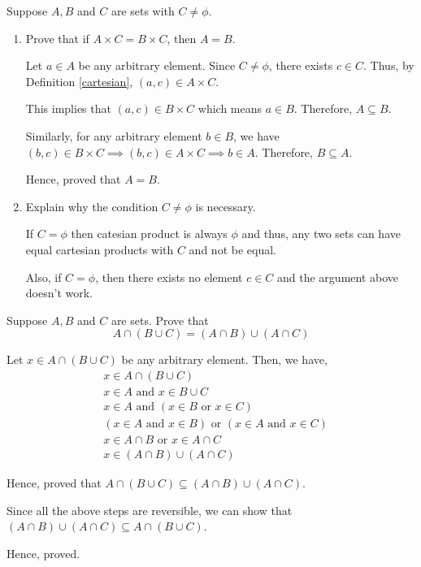 \bp 
	Suppose $A, B$ and $C$ are sets with $C \neq \phi$.
	\begin{enumerate}
	\item Prove that if $A \times C = B \times C$, then $A = B$.

	\bs
		Let $a \in A$ be any arbitrary element. Since $C \neq \phi$, there exists $c \in C$. Thus, by Definition \ref{cartesian}, $(a, c) \in A \times C$.

		This implies that $(a, c) \in B \times C$ which means $a \in B$. Therefore, $A \subseteq B$.

		Similarly, for any arbitrary element $b \in B$, we have $(b, c) \in B \times C \implies (b, c) \in A \times C \implies b \in A$. Therefore, $B \subseteq A$.

		Hence, proved that $A = B$.
	\es
	
	\item Explain why the condition $C \neq \phi$ is necessary.

	\bs
		If $C = \phi$ then catesian product is always $\phi$ and thus, any two sets can have equal cartesian products with $C$ and not be equal.

		Also, if $C = \phi$, then there exists no element $c \in C$ and the argument above doesn't work.
	\es

	\end{enumerate}
\ep 

\bp 
	Suppose $A, B$ and $C$ are sets. Prove that 
	$$A \cap (B \cup C) = (A \cap B) \cup (A \cap C)$$
\ep 

\bs
	Let $x \in A \cap (B \cup C)$ be any arbitrary element. Then, we have,
	\begin{align}
		&x \in A \cap (B \cup C) \\
		&x \in A \text{ and } x \in B \cup C \\
		&x \in A \text{ and } ( x \in B \text{ or } x \in C ) \\
		&(x \in A \text{ and } x \in B) \text{ or } (x \in A \text{ and } x \in C) \\
		&x \in A \cap B \text{ or } x \in A \cap C \\
		&x \in (A \cap B) \cup (A \cap C)
	\end{align}

	Hence, proved that $A \cap (B \cup C) \subseteq (A \cap B) \cup (A \cap C)$.

	Since all the above steps are reversible, we can show that 
	$(A \cap B) \cup (A \cap C) \subseteq A \cap (B \cup C)$.

	Hence, proved.
\es


